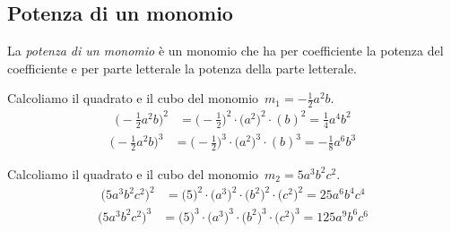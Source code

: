 \subsection{Potenza di un monomio}
\label{subsec:09_monomi_potenza}

% 
% 

\begin{definizione}
La \emph{potenza di un monomio} è un monomio
che ha per coefficiente la potenza del coefficiente e per parte
letterale la potenza della parte letterale.
\end{definizione}

 \begin{esempio}
Calcoliamo il quadrato e il cubo del monomio~\(m_{1}=-{\frac{1}{2}}a^{2}b\).
\begin{align*}
\bigg(-{\frac{1}{2}}a^{2}b\bigg)^{2}
&=\bigg(-{\frac{1}{2}}\bigg)^{2}\cdot\big(a^{2}\big)^{2}\cdot (b)^{2}
=\frac{1}{4}a^{4}b^{2}
\end{align*}
\begin{align*}
\bigg(-{\frac{1}{2}}a^{2}b\bigg)^{3}
&=\bigg(-{\frac{1}{2}}\bigg)^{3}\cdot\big(a^{2}\big)^{3}\cdot (b)^{3}
=-{\frac{1}{8}}a^{6}b^{3}
\end{align*}
 \end{esempio}

 \begin{esempio}
Calcoliamo il quadrato e il cubo del monomio~\(m_{2}=5a^{3}b^{2}c^{2}\).
\begin{align*}
\big(5a^{3}b^{2}c^{2}\big)^{2}
&=\big(5\big)^{2}\cdot \big(a^{3}\big)^{2}\cdot\big(b^{2}\big)^{2}\cdot 
\big(c^{2}\big)^{2}
=25a^{6}b^{4}c^{4}
\end{align*}
\begin{align*}
\big(5a^{3}b^{2}c^{2}\big)^{3}
&=\big(5\big)^{3}\cdot \big(a^{3}\big)^{3}\cdot\big(b^{2}\big)^{3}\cdot 
\big(c^{2}\big)^{3}
=125a^{9}b^{6}c^{6}
\end{align*}
 \end{esempio}

